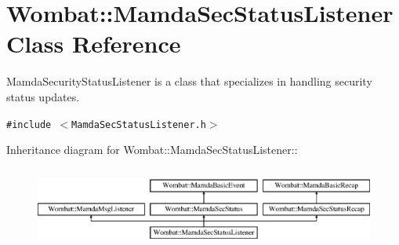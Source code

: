\hypertarget{classWombat_1_1MamdaSecStatusListener}{
\section{Wombat::Mamda\-Sec\-Status\-Listener Class Reference}
\label{classWombat_1_1MamdaSecStatusListener}
}
Mamda\-Security\-Status\-Listener is a class that specializes in handling security status updates.  


{\tt \#include $<$Mamda\-Sec\-Status\-Listener.h$>$}

Inheritance diagram for Wombat::Mamda\-Sec\-Status\-Listener::\begin{figure}[H]
\begin{center}
\leavevmode
\includegraphics[height=2.64151cm]{classWombat_1_1MamdaSecStatusListener}
\end{center}
\end{figure}

